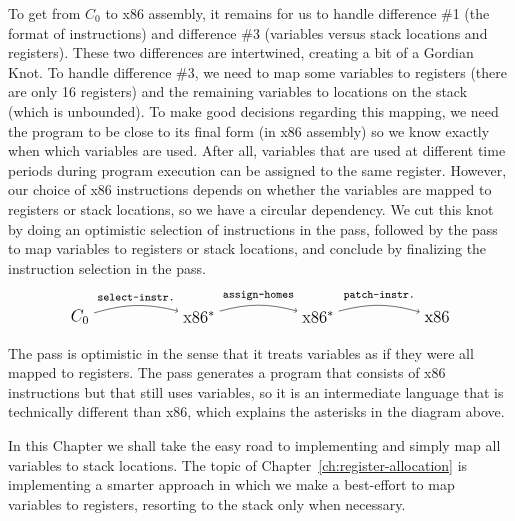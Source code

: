 \documentclass[11pt]{book}
\begin{document}
To get from $C_0$ to x86 assembly, it remains for us to handle
difference \#1 (the format of instructions) and difference \#3
(variables versus stack locations and registers). These two
differences are intertwined, creating a bit of a Gordian Knot. To
handle difference \#3, we need to map some variables to registers
(there are only 16 registers) and the remaining variables to locations
on the stack (which is unbounded). To make good decisions regarding
this mapping, we need the program to be close to its final form (in
x86 assembly) so we know exactly when which variables are used. After
all, variables that are used at different time periods during program
execution can be assigned to the same register.  However, our choice
of x86 instructions depends on whether the variables are mapped to
registers or stack locations, so we have a circular dependency. We cut
this knot by doing an optimistic selection of instructions in the
 pass, followed by the 
pass to map variables to registers or stack locations, and conclude by
finalizing the instruction selection in the 
pass.
\[
\begin{tikzpicture}[baseline=(current  bounding  box.center)]
\node (1) at (0,0)  {\large $C_0$};
\node (2) at (3,0)  {\large $\text{x86}^{*}$};
\node (3) at (6,0)  {\large $\text{x86}^{*}$};
\node (4) at (9,0) {\large $\text{x86}$};

\path[->,bend left=15] (1) edge [above] node {\ttfamily\footnotesize select-instr.} (2);
\path[->,bend left=15] (2) edge [above] node {\ttfamily\footnotesize assign-homes} (3);
\path[->,bend left=15] (3) edge [above] node {\ttfamily\footnotesize patch-instr.} (4);
\end{tikzpicture}
\]

The  pass is optimistic in the sense that it
treats variables as if they were all mapped to registers. The
 pass generates a program that consists of
x86 instructions but that still uses variables, so it is an
intermediate language that is technically different than x86, which
explains the asterisks in the diagram above.

In this Chapter we shall take the easy road to implementing
 and simply map all variables to stack locations.
The topic of Chapter~\ref{ch:register-allocation} is implementing a
smarter approach in which we make a best-effort to map variables to
registers, resorting to the stack only when necessary.
\end{document}
